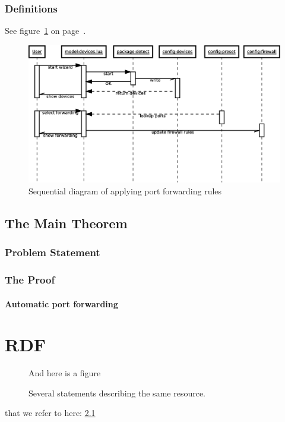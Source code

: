 \documentclass[a4paper,11pt]{kth-mag}
\begin{document}
\subsection{Definitions}
See figure~\ref{fig:wizard-seq_dia} on page~\pageref{fig:wizard-seq_dia}.
\begin{figure}[h!]
   \centering
   \includegraphics[width=15cm]{wizard-seq_dia}
   \caption{Sequential diagram of applying port forwarding rules}
   \label{fig:wizard-seq_dia}
\end{figure}

\section{The Main Theorem}

\subsection{Problem Statement}

\subsection{The Proof}
\subsubsection{Automatic port forwarding}


\appendix
\addappheadtotoc
\chapter{RDF}\label{appA}
\begin{figure}[ht]
   \begin{center}
And here is a figure
      \caption{
         \small{
            Several statements describing the same resource.
         }
      }
      \label{RDF_4}
   \end{center}
\end{figure}

that we refer to here: \ref{RDF_4}



\end{document}
